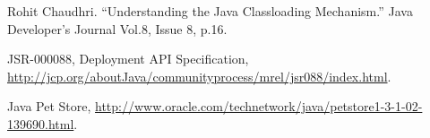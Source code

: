 \documentclass[conference]{IEEEtran}
\begin{document}
\begin{thebibliography}{9}

Rohit Chaudhri. ``Understanding the Java Classloading Mechanism.'' Java Developer's Journal Vol.8, Issue 8, p.16.


JSR-000088, Deployment API Specification, \url{http://jcp.org/aboutJava/communityprocess/mrel/jsr088/index.html}.

Java Pet Store, \url{http://www.oracle.com/technetwork/java/petstore1-3-1-02-139690.html}.











\end{thebibliography}
\end{document}
